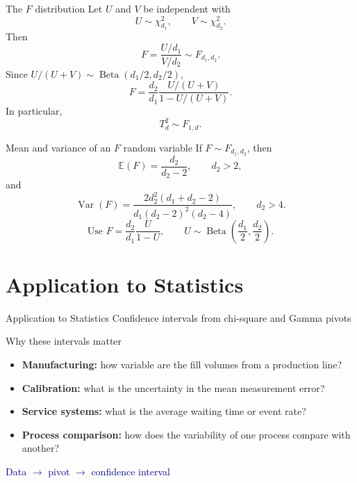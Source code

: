 \documentclass[aspectratio=169,11pt]{beamer}
\newcommand{\E}{\mathbb{E}}
\newcommand{\Var}{\operatorname{Var}}
\begin{document}
\begin{frame}{The $F$ distribution}
  Let $U$ and $V$ be independent with
  \[
    U\sim\chi^2_{d_1},\qquad V\sim\chi^2_{d_2}.
  \]
  Then
  \[
    \boxed{
      F=\frac{U/d_1}{V/d_2}\sim F_{d_1,d_2}.}
  \]
  Since $U/(U+V)\sim\operatorname{Beta}(d_1/2,d_2/2)$,
  \[
    F=\frac{d_2}{d_1}\frac{U/(U+V)}{1-U/(U+V)}.
  \]
  In particular,
  \[
    T_d^2\sim F_{1,d}.
  \]
\end{frame}

\begin{frame}{Mean and variance of an $F$ random variable}
  If $F\sim F_{d_1,d_2}$, then
  \[
    \E(F)=\frac{d_2}{d_2-2},
    \qquad d_2>2,
  \]
  and
  \[
    \Var(F)=
    \frac{2d_2^2(d_1+d_2-2)}
    {d_1(d_2-2)^2(d_2-4)},
    \qquad d_2>4.
  \]
  \[
    \text{Use }F=\frac{d_2}{d_1}\frac{U}{1-U},
    \qquad U\sim\operatorname{Beta}\!\left(\frac{d_1}{2},\frac{d_2}{2}\right).
  \]
\end{frame}

\section{Application to Statistics}

\begin{frame}{Application to Statistics}
  \centering
  \Large Confidence intervals from chi-square and Gamma pivots
\end{frame}

\begin{frame}{Why these intervals matter}
  \begin{itemize}
    \item \textbf{Manufacturing:} how variable are the fill volumes from a production line?
    \item \textbf{Calibration:} what is the uncertainty in the mean measurement error?
    \item \textbf{Service systems:} what is the average waiting time or event rate?
    \item \textbf{Process comparison:} how does the variability of one process compare with another?
  \end{itemize}
  \vfill
  \centering
  \textcolor{navy}{\large Data $\longrightarrow$ pivot $\longrightarrow$ confidence interval}
\end{frame}
\end{document}
